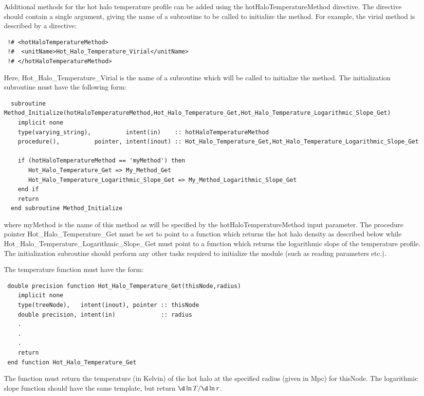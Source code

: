 Additional methods for the hot halo temperature profile can be added using the {\normalfont \ttfamily hotHaloTemperatureMethod} directive. The directive should contain a single argument, giving the name of a subroutine to be called to initialize the method. For example, the {\normalfont \ttfamily virial} method is described by a directive:
\begin{verbatim}
 !# <hotHaloTemperatureMethod>
 !#  <unitName>Hot_Halo_Temperature_Virial</unitName>
 !# </hotHaloTemperatureMethod>
\end{verbatim}
Here, {\normalfont \ttfamily Hot\_Halo\_Temperature\_Virial} is the name of a subroutine which will be called to initialize the method. The initialization subroutine must have the following form:
\begin{verbatim}
  subroutine Method_Initialize(hotHaloTemperatureMethod,Hot_Halo_Temperature_Get,Hot_Halo_Temperature_Logarithmic_Slope_Get)
    implicit none
    type(varying_string),          intent(in)    :: hotHaloTemperatureMethod
    procedure(),          pointer, intent(inout) :: Hot_Halo_Temperature_Get,Hot_Halo_Temperature_Logarithmic_Slope_Get
    
    if (hotHaloTemperatureMethod == 'myMethod') then
       Hot_Halo_Temperature_Get => My_Method_Get
       Hot_Halo_Temperature_Logarithmic_Slope_Get => My_Method_Logarithmic_Slope_Get
    end if
    return
  end subroutine Method_Initialize
\end{verbatim}
where {\normalfont \ttfamily myMethod} is the name of this method as will be specified by the {\normalfont \ttfamily hotHaloTemperatureMethod} input parameter. The procedure pointer {\normalfont \ttfamily Hot\_Halo\_Temperature\_Get} must be set to point to a function which returns the hot halo density as described below while {\normalfont \ttfamily Hot\_Halo\_Temperature\_Logarithmic\_Slope\_Get} must point to a function which returns the logarithmic slope of the temperature profile. The initialization subroutine should perform any other tasks required to initialize the module (such as reading parameters etc.).

The temperature function must have the form:
\begin{verbatim}
 double precision function Hot_Halo_Temperature_Get(thisNode,radius)
    implicit none
    type(treeNode),   intent(inout), pointer :: thisNode
    double precision, intent(in)             :: radius
    .
    .
    .
    return
 end function Hot_Halo_Temperature_Get
\end{verbatim}
The function must return the temperature (in Kelvin) of the hot halo at the specified radius (given in Mpc) for {\normalfont \ttfamily thisNode}. The logarithmic slope function should have the same template, but return $\d\ln T / \d \ln r$.

